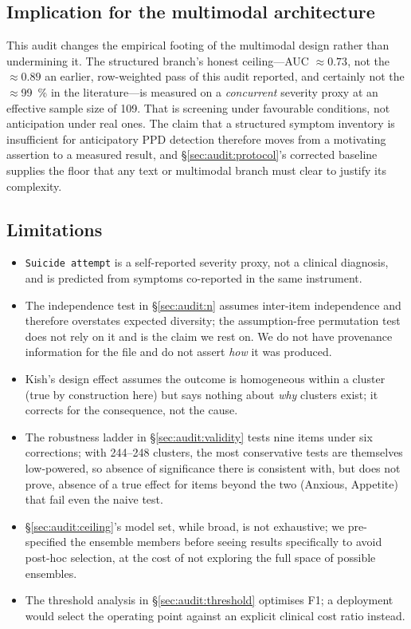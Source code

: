 \subsection{Implication for the multimodal architecture}
\label{sec:audit:implication}

This audit changes the empirical footing of the multimodal design rather than undermining it.
The structured branch's honest ceiling---AUC $\approx 0.73$, not the $\approx 0.89$ an earlier,
row-weighted pass of this audit reported, and certainly not the $\approx$\SI{99}{\percent} in
the literature---is measured on a \emph{concurrent} severity proxy at an effective sample size
of 109. That is screening under favourable conditions, not anticipation under real ones. The
claim that a structured symptom inventory is insufficient for anticipatory PPD detection
therefore moves from a motivating assertion to a measured result, and
\S\ref{sec:audit:protocol}'s corrected baseline supplies the floor that any text or multimodal
branch must clear to justify its complexity.

\subsection{Limitations}
\label{sec:audit:limitations}

\begin{itemize}
  \item \texttt{Suicide attempt} is a self-reported severity proxy, not a clinical diagnosis,
        and is predicted from symptoms co-reported in the same instrument.
  \item The independence test in \S\ref{sec:audit:n} assumes inter-item independence and
        therefore overstates expected diversity; the assumption-free permutation test does not
        rely on it and is the claim we rest on. We do not have provenance information for the
        file and do not assert \emph{how} it was produced.
  \item Kish's design effect assumes the outcome is homogeneous within a cluster (true by
        construction here) but says nothing about \emph{why} clusters exist; it corrects for
        the consequence, not the cause.
  \item The robustness ladder in \S\ref{sec:audit:validity} tests nine items under six
        corrections; with 244--248 clusters, the most conservative tests are themselves
        low-powered, so absence of significance there is consistent with, but does not prove,
        absence of a true effect for items beyond the two (Anxious, Appetite) that fail even
        the naive test.
  \item \S\ref{sec:audit:ceiling}'s model set, while broad, is not exhaustive; we pre-specified
        the ensemble members before seeing results specifically to avoid post-hoc selection, at
        the cost of not exploring the full space of possible ensembles.
  \item The threshold analysis in \S\ref{sec:audit:threshold} optimises F1; a deployment would
        select the operating point against an explicit clinical cost ratio instead.
\end{itemize}
